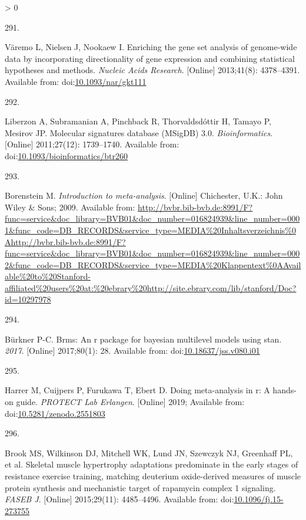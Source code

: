 \documentclass[twoside,10pt]{gihclass} %
\newlength{\cslhangindent}
\newlength{\csllabelwidth}
\newenvironment{CSLReferences}[3] %
 {%
  \setlength{\parindent}{0pt}
  \ifodd #1 \everypar{\setlength{\hangindent}{\cslhangindent}}\ignorespaces\fi
  \ifnum #2 > 0
  \setlength{\parskip}{#2\baselineskip}
  \fi
 }%
 {}
\newcommand{\CSLLeftMargin}[1]{\parbox[t]{\maxof{\widthof{#1}}{\csllabelwidth}}{#1}}
\newcommand{\CSLRightInline}[1]{\parbox[t]{\linewidth}{#1}}
\begin{document}
\begin{CSLReferences}{0}{0}
\leavevmode\hypertarget{ref-RN2891}{}%
\CSLLeftMargin{291. }
\CSLRightInline{Väremo L, Nielsen J, Nookaew I. Enriching the gene set analysis of genome-wide data by incorporating directionality of gene expression and combining statistical hypotheses and methods. \emph{Nucleic Acids Research}. {[}Online{]} 2013;41(8): 4378--4391. Available from: doi:\href{https://doi.org/10.1093/nar/gkt111}{10.1093/nar/gkt111}}

\leavevmode\hypertarget{ref-RN2436}{}%
\CSLLeftMargin{292. }
\CSLRightInline{Liberzon A, Subramanian A, Pinchback R, Thorvaldsdóttir H, Tamayo P, Mesirov JP. Molecular signatures database (MSigDB) 3.0. \emph{Bioinformatics}. {[}Online{]} 2011;27(12): 1739--1740. Available from: doi:\href{https://doi.org/10.1093/bioinformatics/btr260}{10.1093/bioinformatics/btr260}}

\leavevmode\hypertarget{ref-RN2888}{}%
\CSLLeftMargin{293. }
\CSLRightInline{Borenstein M. \emph{Introduction to meta-analysis}. {[}Online{]} Chichester, U.K.: John Wiley \& Sons; 2009. Available from: \url{http://bvbr.bib-bvb.de:8991/F?func=service\&doc_library=BVB01\&doc_number=016824939\&line_number=0001\&func_code=DB_RECORDS\&service_type=MEDIA\%20Inhaltsverzeichnis\%0Ahttp://bvbr.bib-bvb.de:8991/F?func=service\&doc_library=BVB01\&doc_number=016824939\&line_number=0002\&func_code=DB_RECORDS\&service_type=MEDIA\%20Klappentext\%0AAvailable\%20to\%20Stanford-affiliated\%20users\%20at:\%20ebrary\%20http://site.ebrary.com/lib/stanford/Doc?id=10297978}}

\leavevmode\hypertarget{ref-RN2562}{}%
\CSLLeftMargin{294. }
\CSLRightInline{Bürkner P-C. Brms: An r package for bayesian multilevel models using stan. \emph{2017}. {[}Online{]} 2017;80(1): 28. Available from: doi:\href{https://doi.org/10.18637/jss.v080.i01}{10.18637/jss.v080.i01}}

\leavevmode\hypertarget{ref-harrer2019doing}{}%
\CSLLeftMargin{295. }
\CSLRightInline{Harrer M, Cuijpers P, Furukawa T, Ebert D. Doing meta-analysis in r: A hands-on guide. \emph{PROTECT Lab Erlangen}. {[}Online{]} 2019; Available from: doi:\href{https://doi.org/10.5281/zenodo.2551803}{10.5281/zenodo.2551803}}

\leavevmode\hypertarget{ref-RN1642}{}%
\CSLLeftMargin{296. }
\CSLRightInline{Brook MS, Wilkinson DJ, Mitchell WK, Lund JN, Szewczyk NJ, Greenhaff PL, et al. Skeletal muscle hypertrophy adaptations predominate in the early stages of resistance exercise training, matching deuterium oxide-derived measures of muscle protein synthesis and mechanistic target of rapamycin complex 1 signaling. \emph{FASEB J}. {[}Online{]} 2015;29(11): 4485--4496. Available from: doi:\href{https://doi.org/10.1096/fj.15-273755}{10.1096/fj.15-273755}}


\end{CSLReferences}
\end{document}
